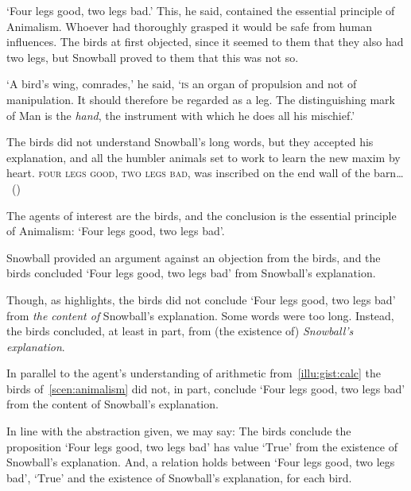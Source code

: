 \begin{note}
  \begin{scenario}[Animalism]
    \label{scen:animalism}
    `Four legs good, two legs bad.'
    This, he said, contained the essential principle of Animalism.
    Whoever had thoroughly grasped it would be safe from human influences.
    The birds at first objected, since it seemed to them that they also had two legs, but Snowball proved to them that this was not so.

    `A bird's wing, comrades,' he said, `\textsc{is} an organ of propulsion and not of manipulation.
    It should therefore be regarded as a leg.
    The distinguishing mark of Man is the \emph{hand}, the instrument with which he does all his mischief.'

    The birds did not understand Snowball's long words, but they accepted his explanation, and all the humbler animals set to work to learn the new maxim by heart.
    \textsc{four legs good, two legs bad}, was inscribed on the end wall of the barn\dots%
    \mbox{ }\hfill\mbox{(\cite[25]{Orwell:1976aa})}%
    \newline
  \end{scenario}

  The agents of interest are the birds, and the conclusion is the essential principle of Animalism:
  `Four legs good, two legs bad'.

  Snowball provided an argument against an objection from the birds, and the birds concluded `Four legs good, two legs bad' from Snowball's explanation.

  Though, as \citeauthor{Orwell:1976aa} highlights, the birds did not conclude `Four legs good, two legs bad' from \emph{the content of} Snowball's explanation.
  Some words were too long.
  Instead, the birds concluded, at least in part, from (the existence of) \emph{Snowball's explanation}.

  In parallel to the agent's understanding of arithmetic from~\autoref{illu:gist:calc} the birds of~\autoref{scen:animalism} did not, in part, conclude `Four legs good, two legs bad' from the content of Snowball's explanation.
\end{note}

\begin{note}
  In line with the abstraction given, we may say:
  The birds conclude the proposition `Four legs good, two legs bad' has value `\(\text{True}\)' from the existence of Snowball's explanation.
  And, a relation holds between `Four legs good, two legs bad', `\(\text{True}\)' and the existence of Snowball's explanation, for each bird.
\end{note}

